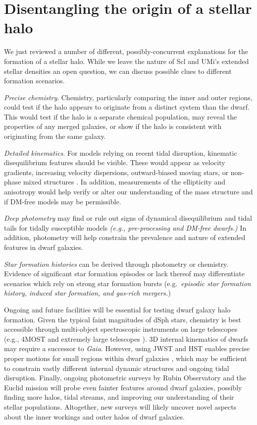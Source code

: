 \section{Disentangling the origin of a stellar
halo}\label{disentangling-the-origin-of-a-stellar-halo}

We just reviewed a number of different, possibly-concurrent explanations
for the formation of a stellar halo. While we leave the nature of Scl
and UMi's extended stellar densities an open question, we can discuss
possible clues to different formation scenarios.

\emph{Precise chemistry}. Chemistry, particularly comparing the inner
and outer regions, could test if the halo appears to originate from a
distinct system than the dwarf. This would test if the halo is a
separate chemical population, may reveal the properties of any merged
galaxies, or show if the halo is consistent with originating from the
same galaxy.

\emph{Detailed kinematics}. For models relying on recent tidal
disruption, kinematic disequilibrium features should be visible. These
would appear as velocity gradients, increasing velocity dispersions,
outward-biased moving stars, or non-phase mixed structures
\citep[e.g,][]{kroupa1997, read+2006, sanchez-salcedo+hernandez2007}. In
addition, measurements of the ellipticity and anisotropy would help
verify or alter our understanding of the mass structure and if DM-free
models may be permissible.

\emph{Deep photometry} may find or rule out signs of dynamical
disequilibrium and tidal tails for tidally susceptible models
\emph{(e.g., pre-processing and DM-free dwarfs.)} In addition,
photometry will help constrain the prevalence and nature of extended
features in dwarf galaxies.

\emph{Star formation histories} can be derived through photometry or
chemistry. Evidence of significant star formation episodes or lack
thereof may differentiate scenarios which rely on strong star formation
bursts (e.g.~\emph{episodic star formation history, induced star
formation, and gas-rich mergers.})

Ongoing and future facilities will be essential for testing dwarf galaxy
halo formation. Given the typical faint magnitudes of dSph stars,
chemistry is best accessible through multi-object spectroscopic
instruments on large telescopes (e.g., 4MOST and extremely large
telescopes \citet{skuladottir+2023}). 3D internal kinematics of dwarfs
may require a successor to \emph{Gaia}. However, using JWST and HST
enables precise proper motions for small regions within dwarf galaxies
\citep[e.g.,][]{vitral+2025}, which may be sufficient to constrain
vastly different internal dynamic structures and ongoing tidal
disruption. Finally, ongoing photometric surveys by Rubin Observatory
\citep{ivezic+2019} and the Euclid mission
\citep{euclidcollaboration+2025} will probe even fainter features around
dwarf galaxies, possibly finding more halos, tidal streams, and
improving our understanding of their stellar populations. Altogether,
new surveys will likely uncover novel aspects about the inner workings
and outer halos of dwarf galaxies.

